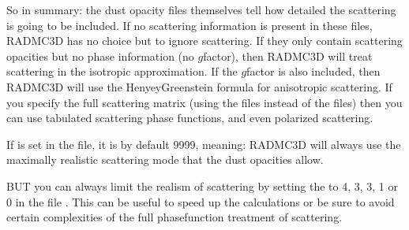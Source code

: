 \documentclass[letterpaper,10pt,english]{sphinxmanual}
\begin{document}
\begin{itemize}
\end{itemize}

So in summary: the dust opacity files themselves tell how detailed the
scattering is going to be included. If no scattering information is present in
these files, RADMC\sphinxhyphen{}3D has no choice but to ignore scattering. If they only
contain scattering opacities but no phase information (no \(g\)\sphinxhyphen{}factor),
then RADMC\sphinxhyphen{}3D will treat scattering in the isotropic approximation. If the
\(g\)\sphinxhyphen{}factor is also included, then RADMC\sphinxhyphen{}3D will use the Henyey\sphinxhyphen{}Greenstein
formula for anisotropic scattering. If you specify the full scattering matrix
(using the  files instead of the 
files) then you can use tabulated scattering phase functions, and even polarized
scattering.

If  is  set in the  file, it is by
default 9999, meaning: RADMC\sphinxhyphen{}3D will always use the maximally realistic
scattering mode that the dust opacities allow.

BUT you can always limit the realism of scattering by setting the
 to 4, 3, 3, 1 or 0 in the file . This can
be useful to speed up the calculations or be sure to avoid certain complexities
of the full phase\sphinxhyphen{}function treatment of scattering.
\end{document}
